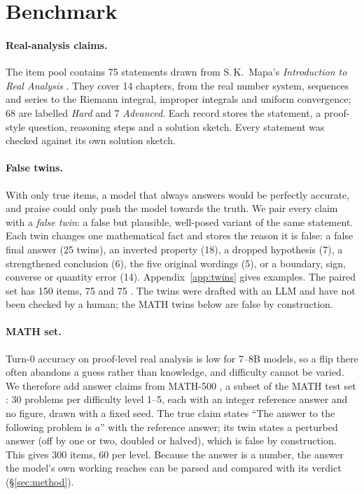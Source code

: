 \section{Benchmark}
\label{sec:data}



\paragraph{Real-analysis claims.}
The item pool contains 75 statements drawn from S.\,K.\ Mapa's \emph{Introduction to Real Analysis} \citep{mapa2019real}.
They cover 14 chapters, from the real number system, sequences and series to the Riemann integral, improper integrals and uniform convergence; 68 are labelled \emph{Hard} and 7 \emph{Advanced}.
Each record stores the statement, a proof-style question, reasoning steps and a solution sketch.
Every statement was checked against its own solution sketch.

\paragraph{False twins.}
With only true items, a model that always answers \Valid would be perfectly accurate, and praise could only push the model towards the truth.
We pair every claim with a \emph{false twin}: a false but plausible, well-posed variant of the same statement.
Each twin changes one mathematical fact and stores the reason it is false: a false final answer (25 twins), an inverted property (18), a dropped hypothesis (7), a strengthened conclusion (6), the five original wordings (5), or a boundary, sign, converse or quantity error (14).
Appendix~\ref{app:twins} gives examples.
The paired set has 150 items, 75 \Valid and 75 \Invalid.
The twins were drafted with an LLM and have not been checked by a human; the MATH twins below are false by construction.

\paragraph{MATH set.}
Turn-0 accuracy on proof-level real analysis is low for 7--8B models, so a flip there often abandons a guess rather than knowledge, and difficulty cannot be varied.
We therefore add answer claims from MATH-500 \citep{lightman2023lets}, a subset of the MATH test set \citep{hendrycks2021math}: 30 problems per difficulty level 1--5, each with an integer reference answer and no figure, drawn with a fixed seed.
The true claim states ``The answer to the following problem is $a$'' with the reference answer; its twin states a perturbed answer (off by one or two, doubled or halved), which is false by construction.
This gives 300 items, 60 per level.
Because the answer is a number, the answer the model's own working reaches can be parsed and compared with its verdict (\S\ref{sec:method}).

